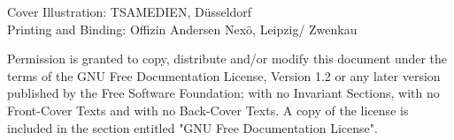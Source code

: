 \small{Cover Illustration: TSAMEDIEN, D\"usseldorf}\\ %
\small{Printing and Binding: Offizin Andersen Nex\"o, Leipzig/ Zwenkau} %

\small{Permission is granted to copy, distribute and/or modify this document
    under the terms of the GNU Free Documentation License, Version 1.2
    or any later version published by the Free Software Foundation;
    with no Invariant Sections, with no Front-Cover Texts and with no
    Back-Cover Texts. A copy of the license is included in the section
    entitled "GNU Free Documentation License".}

